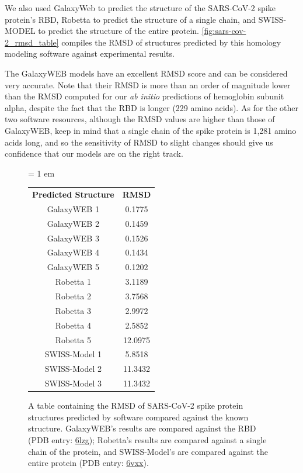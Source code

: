 We also used GalaxyWeb to predict the structure of the SARS-CoV-2 spike protein's RBD, Robetta to predict the structure of a single chain, and SWISS-MODEL to predict the structure of the entire protein. \autoref{fig:sars-cov-2_rmsd_table} compiles the RMSD of structures predicted by this homology modeling software against experimental results.

The GalaxyWEB models have an excellent RMSD score and can be considered very accurate. Note that their RMSD is more than an order of magnitude lower than the RMSD computed for our \textit{ab initio} predictions of hemoglobin subunit alpha, despite the fact that the RBD is longer (229 amino acids). As for the other two software resources, although the RMSD values are higher than those of GalaxyWEB, keep in mind that a single chain of the spike protein is 1,281 amino acids long, and so the sensitivity of RMSD to slight changes should give us confidence that our models are on the right track.\\

\begin{figure}[h]
	\centering
	\tabcolsep = 1 em
	\mySfFamily
	\begin{tabular}{c c}
		\textbf{Predicted Structure} & \textbf{RMSD} \\
		GalaxyWEB 1 & \phantom{x}0.1775 \\
		GalaxyWEB 2 & \phantom{x}0.1459 \\
		GalaxyWEB 3 & \phantom{x}0.1526 \\
		GalaxyWEB 4 & \phantom{x}0.1434 \\
		GalaxyWEB 5 & \phantom{x}0.1202 \\
		Robetta 1 & \phantom{x}3.1189 \\
		Robetta 2 & \phantom{x}3.7568 \\
		Robetta 3 & \phantom{x}2.9972 \\
		Robetta 4 & \phantom{x}2.5852 \\
		Robetta 5 & 12.0975 \\
		SWISS-Model 1 & \phantom{x}5.8518 \\
		SWISS-Model 2 & 11.3432 \\
		SWISS-Model 3 & 11.3432 \\
	\end{tabular}
	\caption{A table containing the RMSD of SARS-CoV-2 spike protein structures predicted by software compared against the known structure. GalaxyWEB's results are compared against the RBD (PDB entry: \href{https://www.rcsb.org/structure/6lzg}{6lzg}); Robetta's results are compared against a single chain of the protein, and SWISS-Model's are compared against the entire protein (PDB entry: \href{https://www.rcsb.org/structure/6vxx}{6vxx}).}
	\label{fig:sars-cov-2_rmsd_table}
\end{figure}




